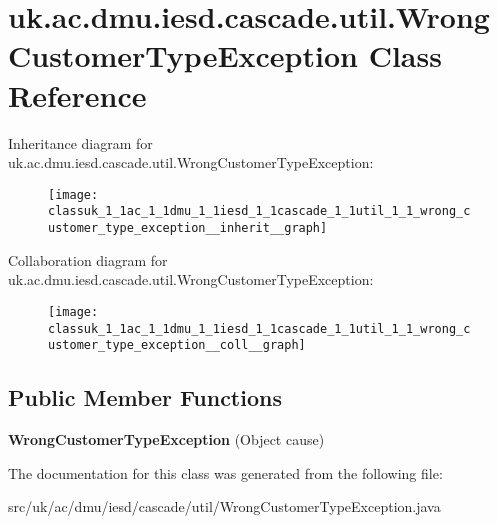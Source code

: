 \hypertarget{classuk_1_1ac_1_1dmu_1_1iesd_1_1cascade_1_1util_1_1_wrong_customer_type_exception}{\section{uk.\-ac.\-dmu.\-iesd.\-cascade.\-util.\-Wrong\-Customer\-Type\-Exception Class Reference}
\label{classuk_1_1ac_1_1dmu_1_1iesd_1_1cascade_1_1util_1_1_wrong_customer_type_exception}
}


Inheritance diagram for uk.\-ac.\-dmu.\-iesd.\-cascade.\-util.\-Wrong\-Customer\-Type\-Exception\-:\nopagebreak
\begin{figure}[H]
\begin{center}
\leavevmode
\texttt{[image: classuk\_1\_1ac\_1\_1dmu\_1\_1iesd\_1\_1cascade\_1\_1util\_1\_1\_wrong\_customer\_type\_exception\_\_inherit\_\_graph]}
\end{center}
\end{figure}


Collaboration diagram for uk.\-ac.\-dmu.\-iesd.\-cascade.\-util.\-Wrong\-Customer\-Type\-Exception\-:\nopagebreak
\begin{figure}[H]
\begin{center}
\leavevmode
\texttt{[image: classuk\_1\_1ac\_1\_1dmu\_1\_1iesd\_1\_1cascade\_1\_1util\_1\_1\_wrong\_customer\_type\_exception\_\_coll\_\_graph]}
\end{center}
\end{figure}
\subsection*{Public Member Functions}
\begin{DoxyCompactItemize}
\item 
\hypertarget{classuk_1_1ac_1_1dmu_1_1iesd_1_1cascade_1_1util_1_1_wrong_customer_type_exception_a4e68d23dc53b78fa85cdf4b5d6a48b02}{{\bfseries Wrong\-Customer\-Type\-Exception} (Object cause)}\label{classuk_1_1ac_1_1dmu_1_1iesd_1_1cascade_1_1util_1_1_wrong_customer_type_exception_a4e68d23dc53b78fa85cdf4b5d6a48b02}

\end{DoxyCompactItemize}


The documentation for this class was generated from the following file\-:\begin{DoxyCompactItemize}
\item 
src/uk/ac/dmu/iesd/cascade/util/Wrong\-Customer\-Type\-Exception.\-java\end{DoxyCompactItemize}
